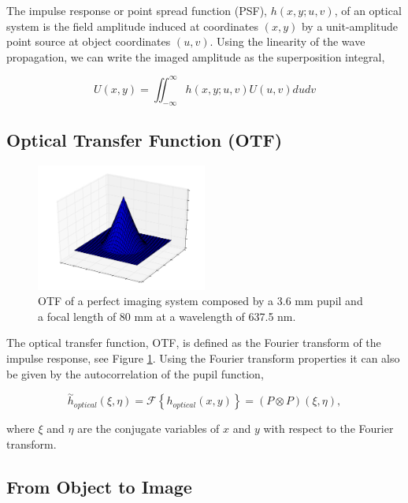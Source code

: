 The impulse response or point spread function (PSF), $h(x,y;u,v)$, of an optical system is  the field amplitude induced at coordinates $(x,y)$ by a unit-amplitude point source at object coordinates $(u,v)$. Using the linearity of the wave propagation, we can write the imaged amplitude as the superposition integral,

\begin{equation}
U(x,y) = \iint_{-\infty}^{\infty} h(x,y;u,v)U(u,v)dudv
\label{eqt:superpositionIntegral}
\end{equation}

\subsection{Optical Transfer Function (OTF)}
\label{subsec:OTF}

\begin{figure}
\begin{center}
\includegraphics[width=0.5\textwidth,angle=0]{Figures/OTF}
\decoRule
\caption{OTF of a perfect imaging system composed by a 3.6 mm pupil and a focal length of 80 mm at a wavelength of 637.5 nm.}
\label{fig:OTF}
\end{center}
\end{figure}

The optical transfer function, OTF, is defined as the Fourier transform of the impulse response, see Figure \ref{fig:OTF}. Using the Fourier transform properties it can also be given by the autocorrelation of the pupil function,

\begin{equation}
\overset{\sim}{h}_{optical}(\xi,\eta) = \mathcal{F}\left\lbrace h_{optical}(x,y)\right\rbrace = (P \otimes P)(\xi,\eta),
\label{eqt:OTF}
\end{equation}

where $\xi$ and $\eta$ are the conjugate variables of $x$ and $y$ with respect to the Fourier transform.

\subsection{From Object to Image}
\label{subsec:FromOtoI}

